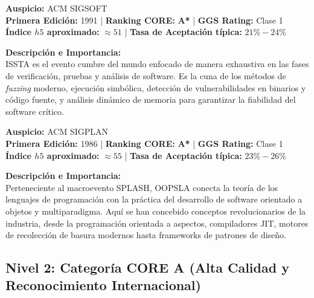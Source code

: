 \documentclass[12pt,a4paper]{article}
\begin{document}
\begin{tcolorbox}[colback=white,colframe=tierAStar,title={\textbf{4. ISSTA -- International Symposium on Software Testing and Analysis}},fonttitle=\bfseries]
\textbf{Auspicio:} ACM SIGSOFT \\
\textbf{Primera Edición:} 1991 \quad | \quad \textbf{Ranking CORE:} \textbf{A*} \quad | \quad \textbf{GGS Rating:} Clase 1 \\
\textbf{Índice $h5$ aproximado:} $\approx 51$ \quad | \quad \textbf{Tasa de Aceptación típica:} $21\% - 24\%$
\end{tcolorbox}
\textbf{Descripción e Importancia:} \\
ISSTA es el evento cumbre del mundo enfocado de manera exhaustiva en las fases de verificación, pruebas y análisis de software. Es la cuna de los métodos de \textit{fuzzing} moderno, ejecución simbólica, detección de vulnerabilidades en binarios y código fuente, y análisis dinámico de memoria para garantizar la fiabilidad del software crítico.

\vspace{0.4cm}

\begin{tcolorbox}[colback=white,colframe=tierAStar,title={\textbf{5. OOPSLA / SPLASH -- Object-Oriented Programming, Systems, Languages \& Applications}},fonttitle=\bfseries]
\textbf{Auspicio:} ACM SIGPLAN \\
\textbf{Primera Edición:} 1986 \quad | \quad \textbf{Ranking CORE:} \textbf{A*} \quad | \quad \textbf{GGS Rating:} Clase 1 \\
\textbf{Índice $h5$ aproximado:} $\approx 55$ \quad | \quad \textbf{Tasa de Aceptación típica:} $23\% - 26\%$
\end{tcolorbox}
\textbf{Descripción e Importancia:} \\
Perteneciente al macroevento SPLASH, OOPSLA conecta la teoría de los lenguajes de programación con la práctica del desarrollo de software orientado a objetos y multiparadigma. Aquí se han concebido conceptos revolucionarios de la industria, desde la programación orientada a aspectos, compiladores JIT, motores de recolección de basura modernos hasta frameworks de patrones de diseño.

\subsection{Nivel 2: Categoría CORE A (Alta Calidad y Reconocimiento Internacional)}
\end{document}
